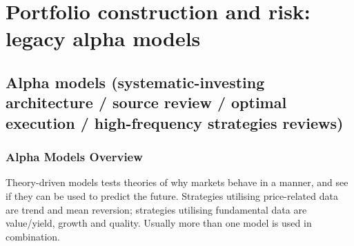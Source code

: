 \documentclass[a4paper,oneside,openany]{book}
\begin{document}
\chapter*{Portfolio construction and risk: legacy alpha models}

\section*{Alpha models (systematic-investing architecture / source review / optimal execution / high-frequency strategies reviews)}

\subsection*{Alpha Models Overview}

Theory-driven models tests theories of why markets behave in a manner, and see if they can be used to predict the future. Strategies utilising price-related data are trend and mean reversion; strategies utilising fundamental data are value/yield, growth and quality. Usually more than one model is used in combination.
\end{document}
